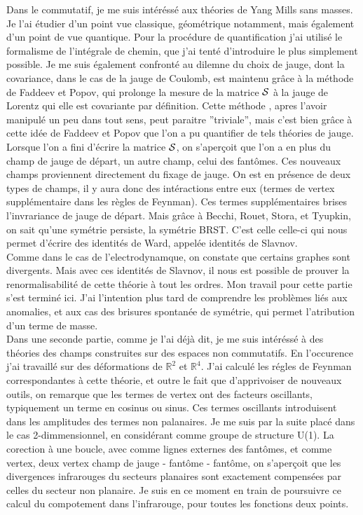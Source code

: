 \documentclass[a4paper,11pt]{article} %
\theoremstyle{plain}
\theoremstyle{definition}
\theoremstyle{remark}
\numberwithin{equation}{section}
\numberwithin{equation}{subsection}
\numberwithin{figure}{section}
\begin{document}
Dans le commutatif, je me suis intéréssé aux théories de Yang Mills sans masses. Je l'ai étudier d'un point vue classique, géométrique 
notamment, mais également d'un point de vue quantique. Pour la procédure de quantification j'ai utilisé le formalisme de l'intégrale de 
chemin, que j'ai tenté d'introduire le plus simplement possible. Je me suis également confronté au dilemne du choix de jauge, dont la 
covariance, dans le cas de la jauge de Coulomb, est maintenu grâce à la méthode de Faddeev et Popov, qui prolonge la mesure de la 
matrice $\cal{S}$ à la jauge de Lorentz qui elle est covariante par définition. Cette méthode , apres l'avoir manipulé un peu dans tout 
sens, peut paraitre ''triviale'', mais c'est bien grâce à cette idée de Faddeev et Popov que l'on a pu quantifier de tels théories de 
jauge. Lorsque l'on a fini d'écrire la matrice $\cal{S}$, on s'aperçoit que l'on a en plus du champ de jauge de départ, un autre champ,
celui des fantômes. Ces nouveaux champs proviennent directement du fixage de jauge. On est en présence de deux types de champs, il y aura 
donc des intéractions entre eux (termes de vertex supplémentaire dans les règles de Feynman). Ces termes supplémentaires brises l'invrariance
de jauge de départ. Mais grâce à Becchi, Rouet, Stora, et Tyupkin, on sait qu'une symétrie persiste, la symétrie BRST. C'est celle celle-ci 
qui nous permet d'écrire des identités de Ward, appelée identités de Slavnov. \\
Comme dans le cas de l'electrodynamque, on constate que certains graphes sont divergents. Mais avec ces identités de Slavnov, il nous est possible 
de prouver la renormalisabilité de cette théorie à tout les ordres. Mon travail pour cette partie s'est terminé ici. J'ai l'intention plus tard de 
comprendre les problèmes liés aux anomalies, et aux cas des brisures spontanée de symétrie, qui permet l'atribution d'un terme de masse. \\

Dans une seconde partie, comme je l'ai déjà dit, je me suis intéréssé à des théories des champs construites sur des espaces non commutatifs. 
En l'occurence j'ai travaillé sur des déformations de $\mathbb{R}^{2}$ et $\mathbb{R}^{4}$. J'ai calculé les régles de Feynman correspondantes 
à cette théorie, et outre le fait que d'apprivoiser de nouveaux outils, on remarque que les termes de vertex ont des facteurs oscillants, 
typiquement un terme en cosinus ou sinus. Ces termes oscillants introduisent dans les amplitudes des termes non palanaires. Je me suis par la 
suite placé dans le cas 2-dimmensionnel, en considérant comme groupe de structure U(1). La corection à une boucle, avec comme lignes externes des 
fantômes, et comme vertex, deux vertex champ de jauge - fantôme - fantôme, on s'aperçoit que les divergences infrarouges du secteurs planaires 
sont exactement compensées par celles du secteur non planaire. Je suis en ce moment en train de poursuivre ce calcul du compotement dans l'infrarouge, 
pour toutes les fonctions deux points.\\
\end{document}
